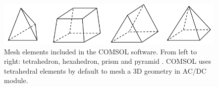 \begin{figure}[ht]
	\includegraphics[width=\textwidth]{03_Prototype/figures/fig006_COMSOL_meshing_elements.png}
	\caption[3D Mesh elements included in the COMSOL software]{Mesh elements included in the COMSOL software. From left to right: tetrahedron, hexahedron, prism and pyramid \cite{mesh2013}. COMSOL uses tetrahedral elements by default to mesh a 3D geometry in AC/DC module.}
	\label{chap3:COMSOL_meshing_elements}
\end{figure}
